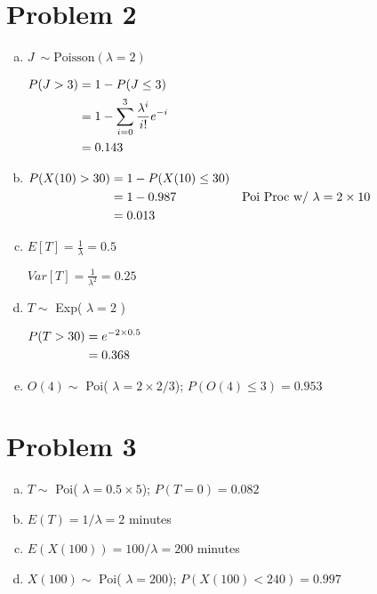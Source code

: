 \documentclass[11pt]{article}
\newenvironment{equ}{$\hfill\begin{aligned}[t]}{\end{aligned}\hfill \null$}
\begin{document}
\section*{Problem 2}
\begin{enumerate}[(a)]
	\item $J\ \sim \text{Poisson} ( \lambda = 2 )$

		\begin{equ}
			P( J > 3 ) &= 1 -P( J \leq 3 ) \\
			&= 1-\sum \limits _{i=0} ^{3} \dfrac{\lambda^i}{i!}e^{-i} \\
			&= 0.143
		\end{equ}

	\item
		\begin{equ}
			P( X(10) > 30 ) &= 1 - P( X(10) \leq 30 ) \\
			&= 1 - 0.987 & \text{Poi Proc w/ } \lambda=2 \times 10 \\
			&= 0.013
		\end{equ}

	\item $E[T] = \frac{1}{\lambda} = 0.5$

		$Var[T] = \frac{1}{\lambda ^2} = 0.25$

	\item $T \sim$ Exp( $\lambda = 2$ )

		\begin{equ} 
			P(T > 30) &= e^{-2 \times 0.5} \\
			&= 0.368
		\end{equ}

	\item $O(4) \sim$ Poi( $\lambda = 2 \times 2/3$); $P(O(4) \leq 3) = 0.953$
\end{enumerate}	

\section*{Problem 3}
\begin{enumerate}[(a)]
	\item $T \sim $ Poi( $\lambda = 0.5 \times 5$); $P( T = 0) = 0.082$
	\item $E(T) = 1/\lambda = 2$ minutes
	\item $E(X(100)) = 100 / \lambda = 200$ minutes
	\item $X(100) \sim $ Poi( $\lambda = 200$); $P( X(100) < 240 ) = 0.997$
\end{enumerate}
\end{document}
